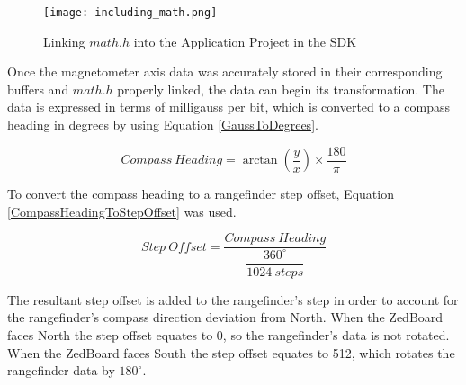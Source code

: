 \begin{figure}[H]
	\centerline{\texttt{[image: including\_math.png]}}
	\caption{Linking $math.h$ into the Application Project in the SDK}
	\label{including_math}
\end{figure}

Once the magnetometer axis data was accurately stored in their corresponding buffers and $math.h$ properly linked, the data can begin its transformation. The data is expressed in terms of milligauss per bit, which is converted to a compass heading in degrees by using Equation \ref{GaussToDegrees}.

\begin{equation}
	Compass\ Heading = \arctan(\dfrac{y}{x})\times\dfrac{180}{\pi}
	\label{GaussToDegrees}
\end{equation}

To convert the compass heading to a rangefinder step offset, Equation \ref{CompassHeadingToStepOffset} was used.

\begin{equation}
	Step\ Offset = \dfrac{Compass\ Heading}{\dfrac{360^\circ}{1024\ steps}}
	\label{CompassHeadingToStepOffset}
\end{equation}

The resultant step offset is added to the rangefinder's step in order to account for the rangefinder's compass direction deviation from North. When the ZedBoard faces North the step offset equates to 0, so the rangefinder's data is not rotated. When the ZedBoard faces South the step offset equates to 512, which rotates the rangefinder data by $180^\circ$.
